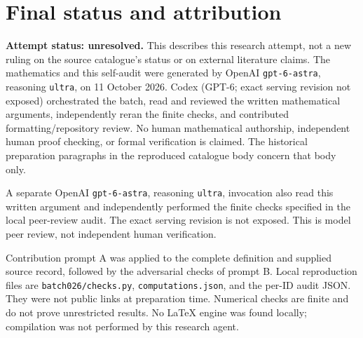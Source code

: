 \documentclass[11pt]{article}
\begin{document}
\section{Final status and attribution}
\textbf{Attempt status: unresolved.} This describes this research attempt, not a new ruling on the source catalogue's status or on external literature claims.
The mathematics and this self-audit were generated by OpenAI \texttt{gpt-6-astra}, reasoning \texttt{ultra}, on 11 October 2026. Codex (GPT-6; exact serving revision not exposed) orchestrated the batch, read and reviewed the written mathematical arguments, independently reran the finite checks, and contributed formatting/repository review. No human mathematical authorship, independent human proof checking, or formal verification is claimed. The historical preparation paragraphs in the reproduced catalogue body concern that body only.

A separate OpenAI \texttt{gpt-6-astra}, reasoning \texttt{ultra}, invocation also read this written argument and independently performed the finite checks specified in the local peer-review audit. The exact serving revision is not exposed. This is model peer review, not independent human verification.

Contribution prompt A was applied to the complete definition and supplied source record, followed by the adversarial checks of prompt B. Local reproduction files are \texttt{batch026/checks.py}, \texttt{computations.json}, and the per-ID audit JSON. They were not public links at preparation time. Numerical checks are finite and do not prove unrestricted results. No LaTeX engine was found locally; compilation was not performed by this research agent.
\end{document}
